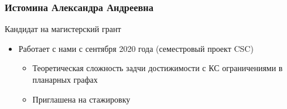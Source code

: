 \documentclass[xcolor=table,aspectratio=169]{beamer}
\begin{document}
\begin{frame}[fragile] \frametitle{Истомина Александра Андреевна}
  \begin{minipage}[m]{0.45\linewidth}
  \end{minipage}\hfill
  \begin{minipage}[m]{0.54\linewidth}
  \vspace{-1.6cm}
  Кандидат на магистерский грант
  \begin{itemize}
        \item Работает с нами с сентября 2020 года (семестровый проект CSC)
        \begin{itemize}
          \item Теоретическая сложность задчи достижимости с КС ограничениями в планарных графах
          \item Приглашена на стажировку
        \end{itemize}

\end{itemize}
\end{minipage}
\end{frame}
\end{document}
